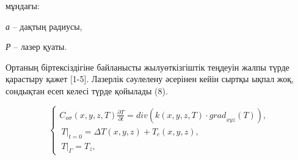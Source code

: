\begin{multicols}{2}
мұндағы:

\emph{а} -- дақтың радиусы,

\emph{Р} -- лазер қуаты.

Ортаның біртексіздігіне байланысты жылуөткізгіштік теңдеуін жалпы түрде
қарастыру қажет {[}1-5{]}. Лазерлік сәулелену әсерінен кейін сыртқы
ықпал жоқ, сондықтан есеп келесі түрде қойылады (8).
\end{multicols}

\begin{equation}
\left\{ \begin{matrix}
C_{o\sigma}(x,y,z,T)\frac{\partial T}{\partial t} = div\left( k(x,y,z,T) \cdot {grad}_{xyz}(T) \right), \\
\left. \ T \right|_{t = 0} = \Delta T(x,y,z) + T_{c}(x,y,z), \\
\left. \ T \right|_{\Gamma} = T_{z},
\end{matrix} \right.
\end{equation}


